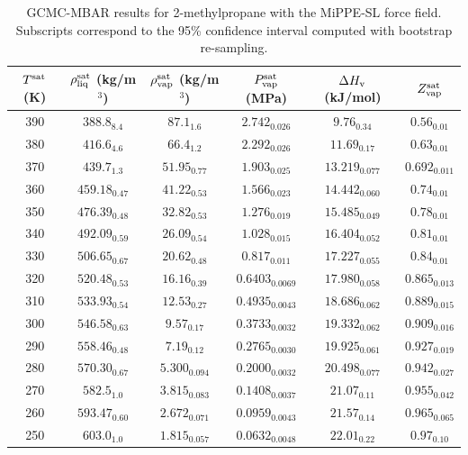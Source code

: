 \documentclass[journal=jctc,manuscript=article]{achemso}
\begin{document}
\begin{table}[htb!]
	\caption{GCMC-MBAR results for 2-methylpropane with the MiPPE-SL force field. Subscripts correspond to the 95\% confidence interval computed with bootstrap re-sampling.}
	\begin{center}
		\begin{tabular}{|c|c|c|c|c|c|}
			\hline
			$T^{\rm sat}$ (K) & $\rho_{\rm liq}^{\rm sat}$ (kg/m$^3$) & $\rho_{\rm vap}^{\rm sat}$ (kg/m$^3$) & $P_{\rm vap}^{\rm sat}$ (MPa) & $\Delta H_{\rm v}$ (kJ/mol) & $Z_{\rm vap}^{\rm sat}$ \\ \hline
			390 & $388.8_{8.4}$ & $87.1_{1.6}$ & $2.742_{0.026}$ & $9.76_{0.34}$ & $0.56_{0.01}$ \\
			380 & $416.6_{4.6}$ & $66.4_{1.2}$ & $2.292_{0.026}$ & $11.69_{0.17}$ & $0.63_{0.01}$ \\
			370 & $439.7_{1.3}$ & $51.95_{0.77}$ & $1.903_{0.025}$ & $13.219_{0.077}$ & $0.692_{0.011}$ \\
			360 & $459.18_{0.47}$ & $41.22_{0.53}$ & $1.566_{0.023}$ & $14.442_{0.060}$ & $0.74_{0.01}$ \\
			350 & $476.39_{0.48}$ & $32.82_{0.53}$ & $1.276_{0.019}$ & $15.485_{0.049}$ & $0.78_{0.01}$ \\
			340 & $492.09_{0.59}$ & $26.09_{0.54}$ & $1.028_{0.015}$ & $16.404_{0.052}$ & $0.81_{0.01}$ \\
			330 & $506.65_{0.67}$ & $20.62_{0.48}$ & $0.817_{0.011}$ & $17.227_{0.055}$ & $0.84_{0.01}$ \\
			320 & $520.48_{0.53}$ & $16.16_{0.39}$ & $0.6403_{0.0069}$ & $17.980_{0.058}$ & $0.865_{0.013}$ \\
			310 & $533.93_{0.54}$ & $12.53_{0.27}$ & $0.4935_{0.0043}$ & $18.686_{0.062}$ & $0.889_{0.015}$ \\
			300 & $546.58_{0.63}$ & $9.57_{0.17}$ & $0.3733_{0.0032}$ & $19.332_{0.062}$ & $0.909_{0.016}$ \\
			290 & $558.46_{0.48}$ & $7.19_{0.12}$ & $0.2765_{0.0030}$ & $19.925_{0.061}$ & $0.927_{0.019}$ \\
			280 & $570.30_{0.67}$ & $5.300_{0.094}$ & $0.2000_{0.0032}$ & $20.498_{0.077}$ & $0.942_{0.027}$ \\
			270 & $582.5_{1.0}$ & $3.815_{0.083}$ & $0.1408_{0.0037}$ & $21.07_{0.11}$ & $0.955_{0.042}$ \\
			260 & $593.47_{0.60}$ & $2.672_{0.071}$ & $0.0959_{0.0043}$ & $21.57_{0.14}$ & $0.965_{0.065}$ \\
			250 & $603.0_{1.0}$ & $1.815_{0.057}$ & $0.0632_{0.0048}$ & $22.01_{0.22}$ & $0.97_{0.10}$ \\
			\hline
		\end{tabular}
	\end{center}
\end{table}
\end{document}
